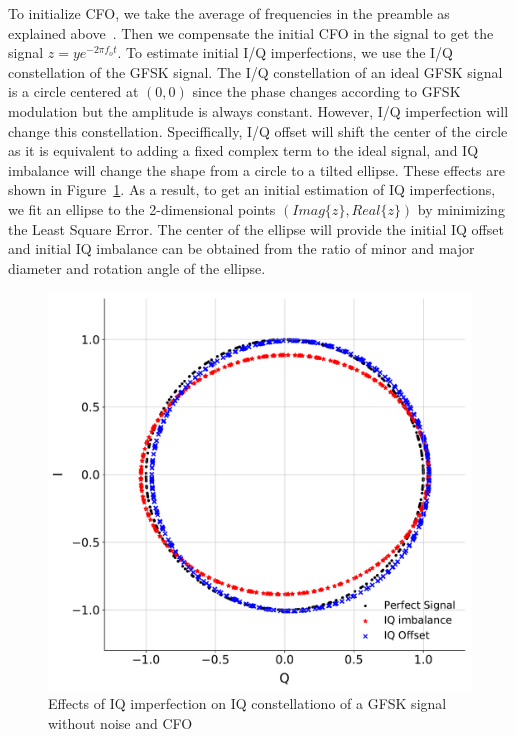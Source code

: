 To initialize CFO, we take the average of frequencies in the preamble as explained above~\cite{?}. Then we compensate the initial CFO in the signal to get the signal $z = y e^{-2\pi f_o t}$. To estimate initial I/Q imperfections, we use the I/Q constellation of the GFSK signal. The I/Q constellation of an ideal GFSK signal is a circle centered at $(0,0)$ since the phase changes according to GFSK modulation but the amplitude is always constant. However, I/Q imperfection will change this constellation. Speciffically, I/Q offset will shift the center of the circle as it is equivalent to adding a fixed complex term to the ideal signal, and IQ imbalance will change the shape from a circle to a tilted ellipse. These effects are shown in Figure~\ref{fig:iq_const}. As a result, to get an initial estimation of IQ imperfections, we fit an ellipse to the 2-dimensional points $(Imag\{z\},Real\{z\})$ by minimizing the Least Square Error. The center of the ellipse will provide the initial IQ offset and initial IQ imbalance can be obtained from the ratio of minor and major diameter and rotation angle of the ellipse.\\
\begin{figure}[t!]
    \centering
    \includegraphics[width = \linewidth]{plots/IQ_const.pdf} 
    \caption{Effects of IQ imperfection on IQ constellationo of a GFSK signal without noise and CFO}
    \label{fig:iq_const}
\end{figure}

